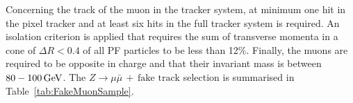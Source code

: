 Concerning the track of the muon in the tracker system, at minimum one hit in the pixel tracker and at least six hits in the full tracker system is required. 
An isolation criterion is applied that requires the sum of transverse momenta in a cone of $\Delta R<0.4$ of all PF particles to be less than 12\%.
Finally, the muons are required to be opposite in charge and that their invariant mass is between $80-100\,\text{Ge}\kern-0.06667em\text{V}$.
The $Z\rightarrow\mu\bar{\mu}\,+\,\text{fake track}$ selection is summarised in Table~\ref{tab:FakeMuonSample}.
\renewcommand{\arraystretch}{1.5}
\begin{table}[!h]
\centering
\caption{Event selection cuts for the muons\,+\,fake control sample to estimate the inclusive fake background.}
\label{tab:FakeMuonSample}
\end{table}
